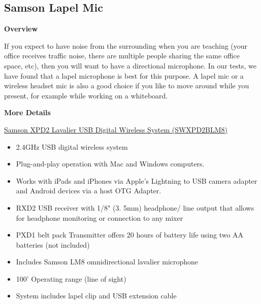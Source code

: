 \begin{gram}
\end{gram}

\begin{gram}
\end{gram}

\subsection{Samson Lapel Mic}
\label{sec:equipment::samsonlapel}

\begin{gram}
\label{grm:equipment::samsonlapel::main}

\textbf{Overview}

If you expect to have noise from the surrounding when you are teaching
(your office receives traffic noise, there are multiple people sharing
the same office space, etc), then you will want to have a
directional microphone.  
%
In our tests, we have found that a lapel microphone is best for this purpose. A lapel mic or a wireless headset mic is also a good choice if you like to move around while you present, for example while working on a whiteboard.
%


\textbf{More Details}

\href{http://www.samsontech.com/samson/products/wireless-systems/xpd-series/xpd2lav/}
{Samson XPD2 Lavalier USB Digital Wireless System (SWXPD2BLM8)}

\begin{itemize}
\item 2.4GHz USB digital wireless system
\item Plug-and-play operation with Mac and Windows computers. 
\item Works with iPads and iPhones via Apple's Lightning to USB camera adapter and Android devices via a host OTG Adapter.

\item RXD2 USB receiver with 1/8" (3. 5mm) headphone/ line output that allows for headphone monitoring or connection to any mixer
\item PXD1 belt pack Transmitter offers 20 hours of battery life using two AA batteries (not included)
\item Includes Samson LM8 omnidirectional lavalier microphone
\item 100' Operating range (line of sight)
\item System includes lapel clip and USB extension cable
\end{itemize}


\end{gram}
